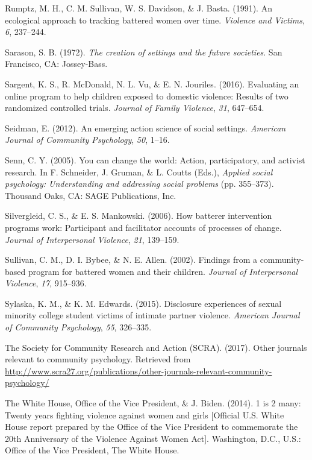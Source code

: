 \documentclass[11pt,]{tufte-book}
\begin{document}
\hypertarget{ref-rumptz1991ecological}{}
Rumptz, M. H., C. M. Sullivan, W. S. Davidson, \& J. Basta. (1991). An
ecological approach to tracking battered women over time. \emph{Violence
and Victims}, \emph{6}, 237--244.

\hypertarget{ref-sarason1972creation}{}
Sarason, S. B. (1972). \emph{The creation of settings and the future
societies}. San Francisco, CA: Jossey-Bass.

\hypertarget{ref-sargent2016evaluating}{}
Sargent, K. S., R. McDonald, N. L. Vu, \& E. N. Jouriles. (2016).
Evaluating an online program to help children exposed to domestic
violence: Results of two randomized controlled trials. \emph{Journal of
Family Violence}, \emph{31}, 647--654.

\hypertarget{ref-seidman2012emerging}{}
Seidman, E. (2012). An emerging action science of social settings.
\emph{American Journal of Community Psychology}, \emph{50}, 1--16.

\hypertarget{ref-senn2005you}{}
Senn, C. Y. (2005). You can change the world: Action, participatory, and
activist research. In F. Schneider, J. Gruman, \& L. Coutts (Eds.),
\emph{Applied social psychology: Understanding and addressing social
problems} (pp. 355--373). Thousand Oaks, CA: SAGE Publications, Inc.

\hypertarget{ref-silvergleid2006batterer}{}
Silvergleid, C. S., \& E. S. Mankowski. (2006). How batterer
intervention programs work: Participant and facilitator accounts of
processes of change. \emph{Journal of Interpersonal Violence},
\emph{21}, 139--159.

\hypertarget{ref-sullivan2002findings}{}
Sullivan, C. M., D. I. Bybee, \& N. E. Allen. (2002). Findings from a
community-based program for battered women and their children.
\emph{Journal of Interpersonal Violence}, \emph{17}, 915--936.

\hypertarget{ref-sylaska2015disclosure}{}
Sylaska, K. M., \& K. M. Edwards. (2015). Disclosure experiences of
sexual minority college student victims of intimate partner violence.
\emph{American Journal of Community Psychology}, \emph{55}, 326--335.

\hypertarget{ref-scra2017other}{}
The Society for Community Research and Action (SCRA). (2017). Other
journals relevant to community psychology. Retrieved from
\url{http://www.scra27.org/publications/other-journals-relevant-community-psychology/}

\hypertarget{ref-biden2014twenty}{}
The White House, Office of the Vice President, \& J. Biden. (2014). 1 is
2 many: Twenty years fighting violence against women and girls
{[}Official U.S. White House report prepared by the Office of the Vice
President to commemorate the 20th Anniversary of the Violence Against
Women Act{]}. Washington, D.C., U.S.: Office of the Vice President, The
White House.
\end{document}
